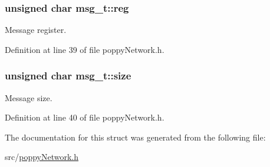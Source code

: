 \hypertarget{structmsg__t_a0aef01fbaf575c639d82d5beee92c421}{
\subsubsection[{reg}]{\setlength{\rightskip}{0pt plus 5cm}unsigned char msg\-\_\-t\-::reg}}\label{structmsg__t_a0aef01fbaf575c639d82d5beee92c421}
Message register. 

Definition at line 39 of file poppy\-Network.\-h.

\hypertarget{structmsg__t_a3736f2ca203e665223b225ca07def9b5}{
\subsubsection[{size}]{\setlength{\rightskip}{0pt plus 5cm}unsigned char msg\-\_\-t\-::size}}\label{structmsg__t_a3736f2ca203e665223b225ca07def9b5}
Message size. 

Definition at line 40 of file poppy\-Network.\-h.



The documentation for this struct was generated from the following file\-:\begin{DoxyCompactItemize}
\item 
src/\hyperlink{poppy_network_8h}{poppy\-Network.\-h}\end{DoxyCompactItemize}
